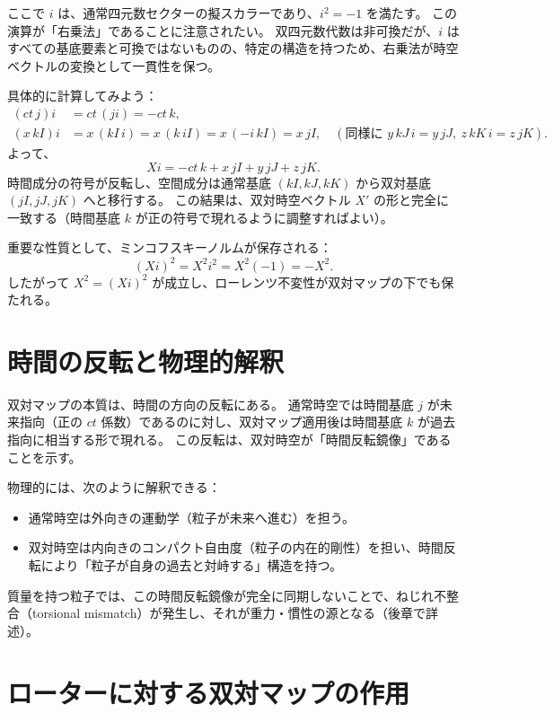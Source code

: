 \documentclass[dvipdfmx,a4paper]{jsbook}
\theoremstyle{definition}
\theoremstyle{remark}
\begin{document}
ここで $i$ は、通常四元数セクターの擬スカラーであり、$i^2 = -1$ を満たす。  
この演算が「右乗法」であることに注意されたい。  
双四元数代数は非可換だが、$i$ はすべての基底要素と可換ではないものの、特定の構造を持つため、右乗法が時空ベクトルの変換として一貫性を保つ。

具体的に計算してみよう：
\begin{align}
  (ct \, j) i &= ct \, (j i) = -ct \, k, \\
  (x \, kI) i &= x \, (kI \, i) = x \, (k \, i I) = x \, ( - i \, k I) = x \, jI, \quad (\text{同様に } y \, kJ \, i = y \, jJ,\ z \, kK \, i = z \, jK).
\end{align}
よって、
\begin{equation}
  X i = -ct \, k + x \, jI + y \, jJ + z \, jK.
\end{equation}
時間成分の符号が反転し、空間成分は通常基底 $(kI, kJ, kK)$ から双対基底 $(jI, jJ, jK)$ へと移行する。  
この結果は、双対時空ベクトル $X'$ の形と完全に一致する（時間基底 $k$ が正の符号で現れるように調整すればよい）。

重要な性質として、ミンコフスキーノルムが保存される：
\begin{equation}
  (X i)^2 = X^2 i^2 = X^2 (-1) = -X^2.
\end{equation}
したがって $X^2 = (X i)^2$ が成立し、ローレンツ不変性が双対マップの下でも保たれる。

\section{時間の反転と物理的解釈}
\label{sec:time-reversal}

双対マップの本質は、時間の方向の反転にある。  
通常時空では時間基底 $j$ が未来指向（正の $ct$ 係数）であるのに対し、双対マップ適用後は時間基底 $k$ が過去指向に相当する形で現れる。  
この反転は、双対時空が「時間反転鏡像」であることを示す。

物理的には、次のように解釈できる：
\begin{itemize}
  \item 通常時空は外向きの運動学（粒子が未来へ進む）を担う。
  \item 双対時空は内向きのコンパクト自由度（粒子の内在的剛性）を担い、時間反転により「粒子が自身の過去と対峙する」構造を持つ。
\end{itemize}
質量を持つ粒子では、この時間反転鏡像が完全に同期しないことで、ねじれ不整合（torsional mismatch）が発生し、それが重力・慣性の源となる（後章で詳述）。

\section{ローターに対する双対マップの作用}
\label{sec:rotor-dual}
\end{document}
